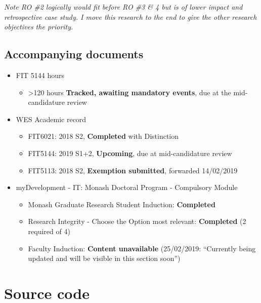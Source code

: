 \documentclass{monashthesis}
\begin{document}
\emph{Note RO \#2 logically would fit before RO \#3 \& 4 but is of lower
impact and retrospective case study. I move this research to the end to
give the other research objectives the priority.}

\section{Accompanying documents}\label{accompanying-documents}

\begin{itemize}
\tightlist
\item
  FIT 5144 hours

  \begin{itemize}
  \tightlist
  \item
    \textgreater{}120 hours \textbf{Tracked, awaiting mandatory events},
    due at the mid-candidature review
  \end{itemize}
\item
  WES Academic record

  \begin{itemize}
  \tightlist
  \item
    FIT6021: 2018 S2, \textbf{Completed} with Distinction
  \item
    FIT5144: 2019 S1+2, \textbf{Upcoming}, due at mid-candidature review
  \item
    FIT5113: 2018 S2, \textbf{Exemption submitted}, forwarded 14/02/2019
  \end{itemize}
\item
  myDevelopment - IT: Monash Doctoral Program - Compulsory Module

  \begin{itemize}
  \tightlist
  \item
    Monash Graduate Research Student Induction: \textbf{Completed}
  \item
    Research Integrity - Choose the Option most relevant:
    \textbf{Completed} (2 required of 4)
  \item
    Faculty Induction: \textbf{Content unavailable} (25/02/2019:
    ``Currently being updated and will be visible in this section
    soon'')
  \end{itemize}
\end{itemize}

\chapter{Source code}\label{sec:source}
\end{document}
